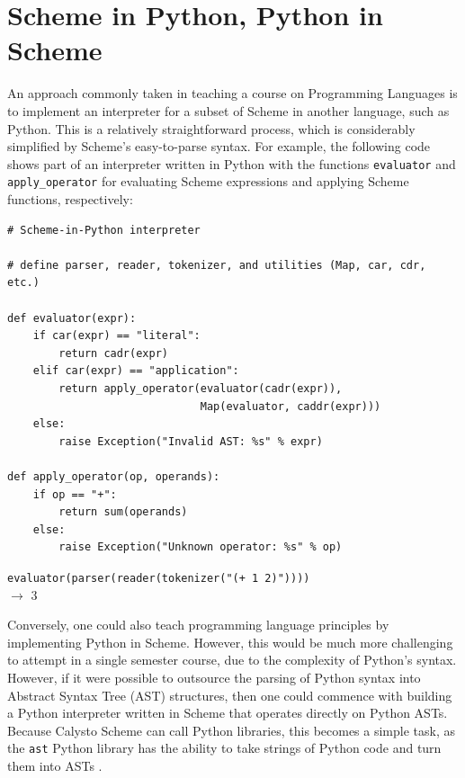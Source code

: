 \documentclass[acmsmall,screen,nonacm]{acmart}
\begin{document}

\section{Scheme in Python, Python in Scheme}

An approach commonly taken in teaching a course on Programming Languages
is to implement an interpreter for a subset of Scheme in another language, such
as Python. This is a relatively straightforward process, which is considerably
simplified by Scheme's easy-to-parse syntax.  For example, the following code
shows part of an interpreter written in Python with the functions
\texttt{evaluator} and \texttt{apply\_operator} for evaluating Scheme
expressions and applying Scheme functions, respectively:\\

\begin{minipage}{\textwidth}
{\small
\begin{verbatim}
# Scheme-in-Python interpreter

# define parser, reader, tokenizer, and utilities (Map, car, cdr, etc.)

def evaluator(expr):
    if car(expr) == "literal":
        return cadr(expr)
    elif car(expr) == "application":
        return apply_operator(evaluator(cadr(expr)),
                              Map(evaluator, caddr(expr)))
    else:
        raise Exception("Invalid AST: %s" % expr)

def apply_operator(op, operands):
    if op == "+":
        return sum(operands)
    else:
        raise Exception("Unknown operator: %s" % op)

\end{verbatim}
\texttt{evaluator(parser(reader(tokenizer("(+ 1 2)"))))}\\
$\rightarrow$ 3\\
}
\end{minipage}

\noindent
Conversely, one could also teach programming language principles by
implementing Python in Scheme. However, this would be much more challenging to
attempt in a single semester course, due to the complexity of Python's
syntax. However, if it were possible to outsource the parsing of Python syntax
into Abstract Syntax Tree (AST) structures, then one could commence with
building a Python interpreter written in Scheme that operates directly on
Python ASTs. Because Calysto Scheme can call Python libraries, this becomes a
simple task, as the \texttt{ast} Python library has the ability to take strings
of Python code and turn them into ASTs \cite{PythonInScheme}.
\end{document}
